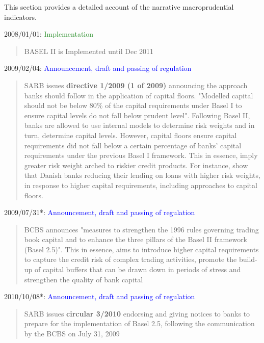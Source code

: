 \documentclass[
  letterpaper,
  DIV=11,
  numbers=noendperiod]{scrartcl}
\begin{document}
This section provides a detailed account of the narrative
macroprudential indicators.

2008/01/01: \textcolor{ForestGreen}{Implementation}

\begin{quote}
            BASEL II is  Implemented until Dec 2011

\end{quote}

2009/02/04:
\textcolor{blue}{Announcement, draft and passing of regulation}

\begin{quote}
SARB issues  \textbf{directive 1/2009 (1 of 2009)} announcing the approach banks should follow in the application of capital floors. "Modelled capital should not be below 80\% of the capital requirements under Basel I to ensure capital levels do not fall below prudent level". Following Basel II, banks are allowed to use internal models to determine risk weights and in turn, determine capital levels. However, capital floors ensure capital requirements did not fall below a certain percentage of banks’ capital requirements under the previous Basel I framework\citep{basel06}. This in essence, imply greater risk weight arched to riskier credit products. For instance,  \cite{imbierowicz2018time} show that Danish banks reducing their lending on loans with higher risk weights, in response to higher capital requirements, including approaches to capital floors.
\end{quote}

2009/07/31*:
\textcolor{blue}{Announcement, draft and passing of regulation}

\begin{quote}BCBS announces "measures to strengthen the 1996 rules governing trading book capital and to enhance the three pillars of the Basel II framework (Basel 2.5)". This in essence, aims  to introduce higher capital requirements to capture the credit risk of complex trading activities, promote the build-up of capital buffers that can be drawn down in periods of stress and strengthen the quality of bank capital\citep{basel09}
\end{quote}

2010/10/08*:
\textcolor{blue}{Announcement, draft and passing of regulation}

\begin{quote}SARB issues \textbf{circular 3/2010} endorsing and giving notices to banks to prepare for the implementation of Basel 2.5, following the communication by the BCBS on July 31, 2009
\end{quote}
\end{document}
